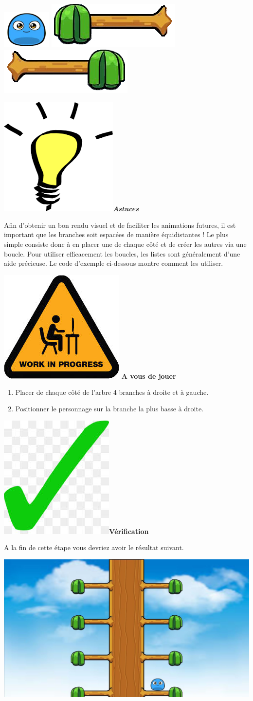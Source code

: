 \documentclass[french]{article}
\newcommand{\tips}{\includegraphics[scale=0.08]{tips}\textbf{\textit{Astuces\\}}}
\newcommand{\todo}{\includegraphics[scale=0.1]{work_in_progress}\textbf{ A vous de jouer\\} }
\newcommand{\result}{\includegraphics[scale=0.1]{green_tick}\textbf{Vérification\\}}
\begin{document}
\begin{center}
	\includegraphics[scale=2]{boo}
	\includegraphics[scale=0.5]{good_branch_left}
	\includegraphics[scale=0.5]{good_branch_right}
\end{center}	

\tips

Afin d'obtenir un bon rendu visuel et de faciliter les animations futures, il est important que les branches soit espacées de manière équidistantes ! Le plus simple consiste donc à en placer une de chaque côté et de créer les autres via une boucle. Pour utiliser efficacement les boucles, les listes sont généralement d'une aide précieuse. Le code d'exemple ci-dessous montre comment les utiliser.	


	
\todo 

\begin{enumerate}
\item Placer de chaque côté de l'arbre 4 branches à droite et à gauche. 
\item Positionner le personnage sur la branche la plus basse à droite.\\

\end{enumerate}

\result

A la fin de cette étape vous devriez avoir le résultat suivant.

\begin{center}
	\includegraphics[scale=0.20]{step2}
\end{center}
\end{document}
